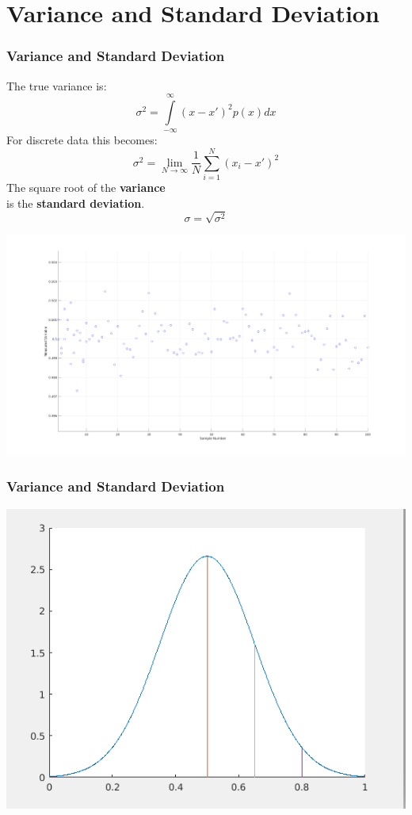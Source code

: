 \documentclass[fleqn]{beamer} %
\newcommand{\sectiontitleII}{Variance and Standard Deviation}
\begin{document}
\section{\sectiontitleII}	
	\begin{frame}[label=sectionII] \small
		\frametitle{\sectiontitleII}    
		
		\begin{multicols}{2} \tiny
		The true variance is:\\
		\[ \sigma^2=\int\limits_{-\infty}^{\infty}(x-x')^2p(x)dx \]
		For discrete data this becomes:\\
		\[ \sigma^2=\lim\limits_{N\rightarrow \infty}\frac{1}{N}\sum\limits_{i=1}^{N}(x_i-x')^2 \]
		The square root of the {\bf \BL variance} \\
		is the {\bf \PR standard deviation}. \\
		\[\sigma=\sqrt{\sigma^2}\]

		\hspace*{-1.5cm}\includegraphics[scale=.20]{topic2_measured_fig2.png}		
		
		\end{multicols}


	\end{frame}
	
	\begin{frame} \small
		\frametitle{\sectiontitleII}    

		\includegraphics[scale=.50]{lecture1_fig1.png}		
		
	\end{frame}
	
\end{document}
